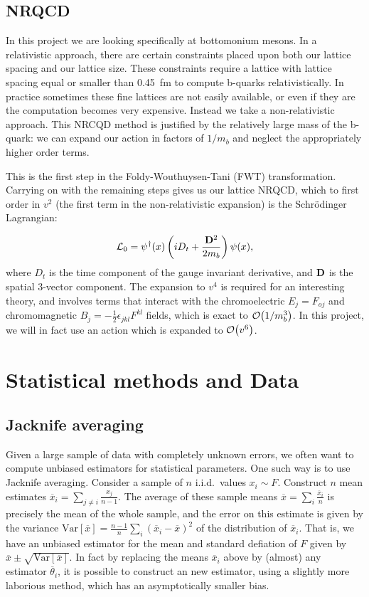 \documentclass[a4paper,12pt]{article}
\begin{document}
\subsection{NRQCD}
In this project we are looking specifically at bottomonium mesons. In a relativistic approach, there are certain constraints placed upon both our lattice spacing and our lattice size. These constraints require a lattice with lattice spacing equal or smaller than \SI{0.45}{fm} to compute b-quarks relativistically\cite{2015Colquhoun}. In practice sometimes these fine lattices are not easily available, or even if they are the computation becomes very expensive. Instead we take a non-relativistic approach. This NRCQD method is justified by the relatively large mass of the b-quark: we can expand our action in factors of $1/m_b$ and neglect the appropriately higher order terms.

This is the first step in the Foldy-Wouthuysen-Tani (FWT) transformation. Carrying on with the remaining steps gives us our lattice NRQCD, which to first order in $v^2$ (the first term in the non-relativistic expansion) is the Schrödinger Lagrangian:

\begin{equation}
    \label{eq:NRQCDS0}
    \mathcal{L}_0 = \psi^\dagger(x)\left(i D_t + \frac{\vb{D}^2}{2m_b}\right)\psi(x),
\end{equation}
where $D_t$ is the time component of the gauge invariant derivative, and $\vb{D}$ is the spatial 3-vector component. The expansion to $v^4$ is required for an interesting theory, and involves terms that interact\cite{2010Meinel} with the chromoelectric $E_j = F_{oj}$ and chromomagnetic $B_j = -\frac{1}{2}\epsilon_{jkl}F^{kl}$ fields, which is exact to $\order{1/m_b^3}$. In this project, we will in fact use an action which is expanded to $\order{v^6}$.

\section{Statistical methods and Data}
\subsection{Jacknife averaging}
Given a large sample of data with completely unknown errors, we often want to compute unbiased estimators for statistical parameters. One such way is to use Jacknife averaging\cite{efron1982jackknife}. Consider a sample of $n$ i.i.d.\ values $x_i \sim F$. Construct $n$ mean estimates $\overline{x}_i = \sum_{j\neq i} \frac{x_j}{n-1}$. The average of these sample means $\overline{x} = \sum_i\frac{\overline{x}_i}{n}$ is precisely the mean of the whole sample, and the error on this estimate is given by the variance $\text{Var}[\overline{x}] = \frac{n-1}{n}\sum_i{(\overline{x}_i - \overline{x})}^2$ of the distribution of $\overline{x}_i$. That is, we have an unbiased estimator for the mean and standard defiation of $F$ given by $\overline{x} \pm \sqrt{\text{Var}[\overline{x}]}$. In fact by replacing the means $\overline{x}_i$ above by (almost) any estimator $\overline{\theta}_i$, it is possible to construct an new estimator, using a slightly more laborious method, which has an asymptotically smaller bias\cite{mcintosh2016jackknife}.
\end{document}
